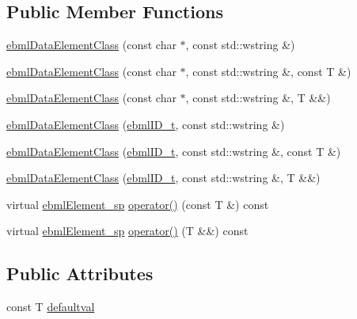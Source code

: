 \subsection*{Public Member Functions}
\begin{DoxyCompactItemize}
\item 
\mbox{\hyperlink{classebml_1_1ebmlDataElementClass_3_01const_01T_01_4_ad773b2b4c45bcb51ebfcba12d4888de2}{ebml\+Data\+Element\+Class}} (const char $\ast$, const std\+::wstring \&)
\item 
\mbox{\hyperlink{classebml_1_1ebmlDataElementClass_3_01const_01T_01_4_a99c231404d053be2783f12671428baa5}{ebml\+Data\+Element\+Class}} (const char $\ast$, const std\+::wstring \&, const T \&)
\item 
\mbox{\hyperlink{classebml_1_1ebmlDataElementClass_3_01const_01T_01_4_a6520906c14ba70894272b26833de66c9}{ebml\+Data\+Element\+Class}} (const char $\ast$, const std\+::wstring \&, T \&\&)
\item 
\mbox{\hyperlink{classebml_1_1ebmlDataElementClass_3_01const_01T_01_4_a83d68654ada83eb978d50133b93df485}{ebml\+Data\+Element\+Class}} (\mbox{\hyperlink{namespaceebml_a86c5f604ddf12a74aa9812e997a58691}{ebml\+I\+D\+\_\+t}}, const std\+::wstring \&)
\item 
\mbox{\hyperlink{classebml_1_1ebmlDataElementClass_3_01const_01T_01_4_afabeada87b7b2a7fd9a5944b8534cb5d}{ebml\+Data\+Element\+Class}} (\mbox{\hyperlink{namespaceebml_a86c5f604ddf12a74aa9812e997a58691}{ebml\+I\+D\+\_\+t}}, const std\+::wstring \&, const T \&)
\item 
\mbox{\hyperlink{classebml_1_1ebmlDataElementClass_3_01const_01T_01_4_a2b30da4fc5e2e00ee773db25db952704}{ebml\+Data\+Element\+Class}} (\mbox{\hyperlink{namespaceebml_a86c5f604ddf12a74aa9812e997a58691}{ebml\+I\+D\+\_\+t}}, const std\+::wstring \&, T \&\&)
\item 
virtual \mbox{\hyperlink{namespaceebml_adad533b7705a16bb360fe56380c5e7be}{ebml\+Element\+\_\+sp}} \mbox{\hyperlink{classebml_1_1ebmlDataElementClass_3_01const_01T_01_4_a7873f495e6b29cca5f3d73e0e34873f5}{operator()}} (const T \&) const
\item 
virtual \mbox{\hyperlink{namespaceebml_adad533b7705a16bb360fe56380c5e7be}{ebml\+Element\+\_\+sp}} \mbox{\hyperlink{classebml_1_1ebmlDataElementClass_3_01const_01T_01_4_ab7167a66c766cc253d32fca44856c70e}{operator()}} (T \&\&) const
\end{DoxyCompactItemize}
\subsection*{Public Attributes}
\begin{DoxyCompactItemize}
\item 
const T \mbox{\hyperlink{classebml_1_1ebmlDataElementClass_3_01const_01T_01_4_aea8b5f04ffa6327c211e20171d75fdcd}{defaultval}}
\end{DoxyCompactItemize}
